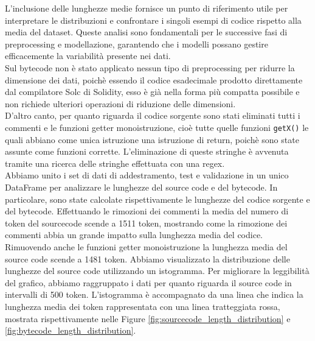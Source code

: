 \documentclass[../../Thesis.tex]{subfiles}
\begin{document}
L'inclusione delle lunghezze medie fornisce un punto di riferimento utile per interpretare le distribuzioni e confrontare i singoli esempi di codice rispetto alla media del dataset. Queste analisi sono fondamentali per le successive fasi di preprocessing e modellazione, garantendo che i modelli possano gestire efficacemente la variabilit\`a presente nei dati.\\
Sul bytecode non \`e stato applicato nessun tipo di preprocessing per ridurre la dimensione dei dati, poich\`e essendo il codice esadecimale prodotto direttamente dal compilatore Solc di Solidity, esso \`e gi\`a nella forma pi\`u compatta possibile e non richiede ulteriori operazioni di riduzione delle dimensioni.\\
D'altro canto, per quanto riguarda il codice sorgente sono stati eliminati tutti i commenti e le funzioni getter monoistruzione, cio\`e tutte quelle funzioni \texttt{getX()} le quali abbiano come unica istruzione una istruzione di return, poich\`e sono state assunte come funzioni corrette. L'eliminazione di queste stringhe \`e avvenuta tramite una ricerca delle stringhe effettuata con una regex.\\
Abbiamo unito i set di dati di addestramento, test e validazione in un unico DataFrame per analizzare le lunghezze del source code e del bytecode. In particolare, sono state calcolate rispettivamente le lunghezze del codice sorgente e del bytecode. Effettuando le rimozioni dei commenti la media del numero di token del sourcecode scende a 1511 token, mostrando come la rimozione dei commenti abbia un grande impatto sulla lunghezza media del codice. Rimuovendo anche le funzioni getter monoistruzione la lunghezza media del source code scende a 1481 token. Abbiamo visualizzato la distribuzione delle lunghezze del source code utilizzando un istogramma. Per migliorare la leggibilit\`a del grafico, abbiamo raggruppato i dati per quanto riguarda il source code in intervalli di 500 token. L'istogramma \`e accompagnato da una linea che indica la lunghezza media dei token rappresentata con una linea tratteggiata rossa, mostrata rispettivamente nelle Figure \ref{fig:sourcecode_length_distribution} e \ref{fig:bytecode_length_distribution}.\\
\end{document}
